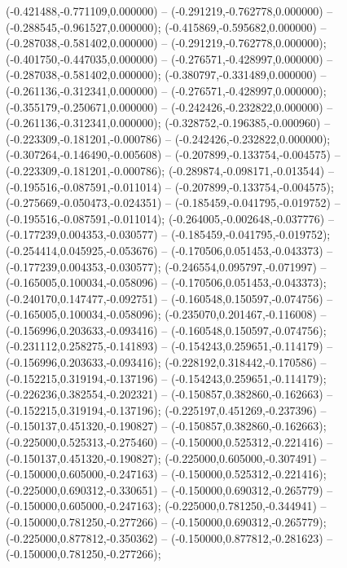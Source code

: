  (-0.421488,-0.771109,0.000000) -- (-0.291219,-0.762778,0.000000) -- (-0.288545,-0.961527,0.000000);
 (-0.415869,-0.595682,0.000000) -- (-0.287038,-0.581402,0.000000) -- (-0.291219,-0.762778,0.000000);
 (-0.401750,-0.447035,0.000000) -- (-0.276571,-0.428997,0.000000) -- (-0.287038,-0.581402,0.000000);
 (-0.380797,-0.331489,0.000000) -- (-0.261136,-0.312341,0.000000) -- (-0.276571,-0.428997,0.000000);
 (-0.355179,-0.250671,0.000000) -- (-0.242426,-0.232822,0.000000) -- (-0.261136,-0.312341,0.000000);
 (-0.328752,-0.196385,-0.000960) -- (-0.223309,-0.181201,-0.000786) -- (-0.242426,-0.232822,0.000000);
 (-0.307264,-0.146490,-0.005608) -- (-0.207899,-0.133754,-0.004575) -- (-0.223309,-0.181201,-0.000786);
 (-0.289874,-0.098171,-0.013544) -- (-0.195516,-0.087591,-0.011014) -- (-0.207899,-0.133754,-0.004575);
 (-0.275669,-0.050473,-0.024351) -- (-0.185459,-0.041795,-0.019752) -- (-0.195516,-0.087591,-0.011014);
 (-0.264005,-0.002648,-0.037776) -- (-0.177239,0.004353,-0.030577) -- (-0.185459,-0.041795,-0.019752);
 (-0.254414,0.045925,-0.053676) -- (-0.170506,0.051453,-0.043373) -- (-0.177239,0.004353,-0.030577);
 (-0.246554,0.095797,-0.071997) -- (-0.165005,0.100034,-0.058096) -- (-0.170506,0.051453,-0.043373);
 (-0.240170,0.147477,-0.092751) -- (-0.160548,0.150597,-0.074756) -- (-0.165005,0.100034,-0.058096);
 (-0.235070,0.201467,-0.116008) -- (-0.156996,0.203633,-0.093416) -- (-0.160548,0.150597,-0.074756);
 (-0.231112,0.258275,-0.141893) -- (-0.154243,0.259651,-0.114179) -- (-0.156996,0.203633,-0.093416);
 (-0.228192,0.318442,-0.170586) -- (-0.152215,0.319194,-0.137196) -- (-0.154243,0.259651,-0.114179);
 (-0.226236,0.382554,-0.202321) -- (-0.150857,0.382860,-0.162663) -- (-0.152215,0.319194,-0.137196);
 (-0.225197,0.451269,-0.237396) -- (-0.150137,0.451320,-0.190827) -- (-0.150857,0.382860,-0.162663);
 (-0.225000,0.525313,-0.275460) -- (-0.150000,0.525312,-0.221416) -- (-0.150137,0.451320,-0.190827);
 (-0.225000,0.605000,-0.307491) -- (-0.150000,0.605000,-0.247163) -- (-0.150000,0.525312,-0.221416);
 (-0.225000,0.690312,-0.330651) -- (-0.150000,0.690312,-0.265779) -- (-0.150000,0.605000,-0.247163);
 (-0.225000,0.781250,-0.344941) -- (-0.150000,0.781250,-0.277266) -- (-0.150000,0.690312,-0.265779);
 (-0.225000,0.877812,-0.350362) -- (-0.150000,0.877812,-0.281623) -- (-0.150000,0.781250,-0.277266);
